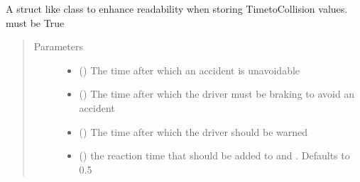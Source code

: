 \documentclass[letterpaper,10pt,english]{sphinxmanual}
\begin{document}
\begin{fulllineitems}
\label{\detokenize{no_collide:lib.nocollide.TtcTimes}}
A struct like class to enhance readability when storing Time\sphinxhyphen{}to\sphinxhyphen{}Collision values.
 must be True
\begin{quote}\begin{description}
\item[{Parameters}] \leavevmode\begin{itemize}
\item {} 
 () \textendash{} The time after which an accident is unavoidable

\item {} 
 () \textendash{} The time after which the driver must be braking to avoid an accident

\item {} 
 () \textendash{} The time after which the driver should be warned

\item {} 
 () \textendash{} the reaction time that should be added to  and . Defaults to 0.5

\end{itemize}

\end{description}\end{quote}

\end{fulllineitems}

\end{document}
